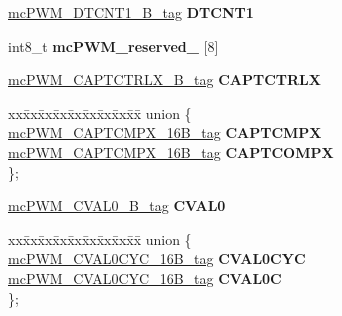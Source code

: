 \begin{DoxyCompactItemize}
\item 
\mbox{\label{structmcPWM__SUBMOD__struct__tag_aec34881c28792674d20f20798b4a5dcf}} 
\mbox{\hyperlink{unionmcPWM__DTCNT1__16B__tag}{mc\+P\+W\+M\+\_\+\+D\+T\+C\+N\+T1\+\_\+B\+\_\+tag}} {\bfseries D\+T\+C\+N\+T1}
\item 
\mbox{\label{structmcPWM__SUBMOD__struct__tag_acc757eb979545ec7b25686f873bfbff4}} 
int8\+\_\+t {\bfseries mc\+P\+W\+M\+\_\+reserved\+\_} \mbox{[}8\mbox{]}
\item 
\mbox{\label{structmcPWM__SUBMOD__struct__tag_a428d0b3b4faf1bf3a8fca6289a441103}} 
\mbox{\hyperlink{unionmcPWM__CAPTCTRLX__16B__tag}{mc\+P\+W\+M\+\_\+\+C\+A\+P\+T\+C\+T\+R\+L\+X\+\_\+B\+\_\+tag}} {\bfseries C\+A\+P\+T\+C\+T\+R\+LX}
\item 
\mbox{\label{structmcPWM__SUBMOD__struct__tag_a85815ebbb76a565011ea132c2253dfa6}} 
\begin{tabbing}
xx\=xx\=xx\=xx\=xx\=xx\=xx\=xx\=xx\=\kill
union \{\\
\>\mbox{\hyperlink{unionmcPWM__CAPTCMPX__16B__tag}{mcPWM\_CAPTCMPX\_16B\_tag}} {\bfseries CAPTCMPX}\\
\>\mbox{\hyperlink{unionmcPWM__CAPTCMPX__16B__tag}{mcPWM\_CAPTCMPX\_16B\_tag}} {\bfseries CAPTCOMPX}\\
\}; \\

\end{tabbing}\item 
\mbox{\label{structmcPWM__SUBMOD__struct__tag_ab5aa6e7fb678de6d2d1fba1bd5eba0de}} 
\mbox{\hyperlink{unionmcPWM__CVAL0__16B__tag}{mc\+P\+W\+M\+\_\+\+C\+V\+A\+L0\+\_\+B\+\_\+tag}} {\bfseries C\+V\+A\+L0}
\item 
\mbox{\label{structmcPWM__SUBMOD__struct__tag_a3d6e97084a22f411c39aacb5c9e8ae53}} 
\begin{tabbing}
xx\=xx\=xx\=xx\=xx\=xx\=xx\=xx\=xx\=\kill
union \{\\
\>\mbox{\hyperlink{unionmcPWM__CVAL0CYC__16B__tag}{mcPWM\_CVAL0CYC\_16B\_tag}} {\bfseries CVAL0CYC}\\
\>\mbox{\hyperlink{unionmcPWM__CVAL0CYC__16B__tag}{mcPWM\_CVAL0CYC\_16B\_tag}} {\bfseries CVAL0C}\\
\}; \\


\end{tabbing}
\end{DoxyCompactItemize}
